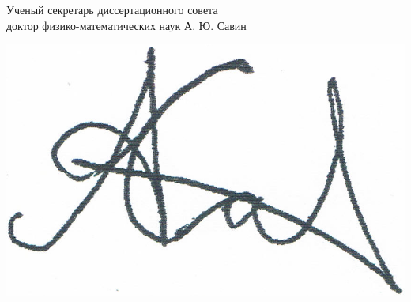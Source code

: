 \documentclass[12pt]{article}
\begin{document}
\noindent
\begin{minipage}{0.97\linewidth}
\noindent
Ученый секретарь диссертационного совета
\\
доктор физико-математических наук
\hfill
А. Ю. Савин
\end{minipage}
\nolinebreak
\hspace{-6.8cm}
\begin{minipage}{0.97\linewidth}
\includegraphics[width=0.10\linewidth]{Savin_signature.png}
\end{minipage}

\vspace{2cm} %
\end{document}
